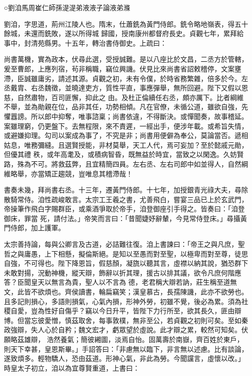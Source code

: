 
\begin{pinyinscope}

 ○劉洎馬周崔仁師孫湜湜弟液液子論液弟滌



 劉洎，字思道，荊州江陵人也。隋末，仕蕭銑為黃門侍郎。銑令略地嶺表，得五十餘城，未還而銑敗，遂以所得城
 歸國，授南康州都督府長史。貞觀七年，累拜給事中，封清苑縣男。十五年，轉治書侍御史。上疏曰：



 尚書萬機，實為政本，伏尋此選，受授誠難。是以八座比於文昌，二丞方於管轄，爰至曹郎，上應列宿，茍非稱職，竊位興譏。伏見比來尚書省詔敕稽停，文案壅滯，臣誠雖庸劣，請述其源。貞觀之初，未有令僕，於時省務繁雜，倍多於今。左丞戴胄、右丞魏徵，並曉達吏方，質性平直，事應彈舉，無所回避。陛下又假以恩慈，自然肅物，百司匪懈，抑此之
 由。及杜正倫續任右丞，頗亦厲下。比者綱維不舉，並為勛親在位，品非其任，功勢相傾。凡在官僚，未循公道，雖欲自強，先懼囂謗。所以郎中抑奪，唯事諮稟；尚書依違，不得斷決。或憚聞奏，故事稽延。案雖理窮，仍更盤下。去無程限，來不責遲，一經出手，便涉年載。或希旨失情，或避嫌抑理。勾司以案成為事了，不究是非；尚書用便僻為奉公，莫論當否。遞相姑息，唯務彌縫。且選賢授能，非材莫舉，天工人代，焉可妄加？至於懿戚元勛，但優其禮
 秩，或年高耄及，或積病智昏，既無益於時宜，當致之以閑逸。久妨賢路，殊為不可。將救茲弊，且宜精簡四員。左右丞、左右司郎中如並得人，自然綱維略舉，亦當矯正趨競，豈唯息其稽滯哉！



 書奏未幾，拜尚書右丞。十三年，遷黃門侍郎。十七年，加授銀青光祿大夫，尋除散騎常侍。洎性疏峻敢言。太宗工王羲之書，尤善飛白，嘗宴三品已上於玄武門，帝操筆作飛白字賜群臣，或乘酒爭取於帝手，洎登御座引手得之。皆奏曰：「洎登御床，罪當
 死，請付法。」帝笑而言曰：「昔聞婕妤辭輦，今見常侍登床。」尋攝黃門侍郎，加上護軍。



 太宗善持論，每與公卿言及古道，必詰難往復。洎上書諫曰：「帝王之與凡庶，聖哲之與庸愚，上下相懸，擬倫斯絕。是知以至愚而對至聖，以極卑而對至尊，徒思自強，不可得也。陛下降恩旨，假慈顏，凝旒以聽其言，虛襟以納其說，猶恐群下未敢對揚，況動神機，縱天辯，飾辭以折其理，援古以排其議，欲令凡庶何階應答？臣聞皇天以無言為貴，聖人以不言為
 德，老君稱大辯若訥，莊生稱至道無文，此皆不欲煩也。齊侯讀書，輪扁竊笑；漢皇慕古，長孺陳譏，此亦不欲勞也。且多記則損心，多語則損氣，心氣內損，形神外勞，初雖不覺，後必為累。須為社稷自愛，豈為性好自傷乎？竊以今日升平，皆陛下力行所至，欲其長久，匪由辯博。但當忘彼愛憎，慎茲取舍，每事敦樸，無非至公，若貞觀之初則可矣。至如秦政強辯，失人心於自矜；魏文宏才，虧眾望於虛說。此才辯之累，較然可知矣。伏願略茲雄辯，
 浩然養氣；簡彼緗圖，淡焉自怡。固萬壽於南嶽，齊百姓於東戶，則天下幸甚，皇恩斯畢。」手詔答曰：「非慮無以臨下，非言無以述慮。比有談論，遂致煩多。輕物驕人，恐由茲道。形神心氣，非此為勞。今聞讜言，虛懷以改。」時皇太子初立，洎以為宜尊賢重道，上書曰：




\end{pinyinscope}
